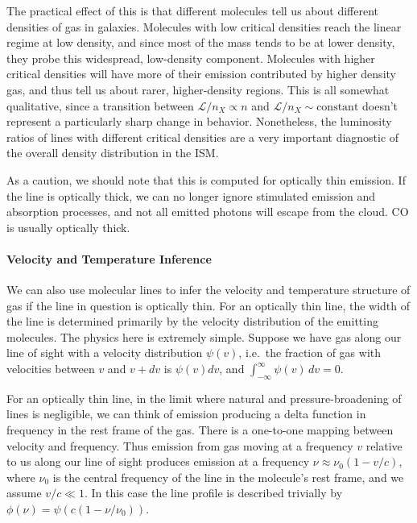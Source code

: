 The practical effect of this is that different molecules tell us about different densities of gas in galaxies. Molecules with low critical densities reach the linear regime at low density, and since most of the mass tends to be at lower density, they probe this widespread, low-density component. Molecules with higher critical densities will have more of their emission contributed by higher density gas, and thus tell us about rarer, higher-density regions. This is all somewhat qualitative, since a transition between $\mathcal{L}/n_X \propto n$ and $\mathcal{L}/n_X \sim\mbox{constant}$ doesn't represent a particularly sharp change in behavior. Nonetheless, the luminosity ratios of lines with different critical densities are a very important diagnostic of the overall density distribution in the ISM.

As a caution, we should note that this is computed for optically thin emission. If the line is optically thick, we can no longer ignore stimulated emission and absorption processes, and not all emitted photons will escape from the cloud. CO is usually optically thick.

\paragraph{Velocity and Temperature Inference}

We can also use molecular lines to infer the velocity and temperature structure of gas if the line in question is optically thin. For an optically thin line, the width of the line is determined primarily by the velocity distribution of the emitting molecules. The physics here is extremely simple. Suppose we have gas along our line of sight with a velocity distribution $\psi(v)$, i.e.\ the fraction of gas with velocities between $v$ and $v+dv$ is $\psi(v) dv$, and $\int_{-\infty}^{\infty} \psi(v) \, dv = 0$.

For an optically thin line, in the limit where natural and pressure-broadening of lines is negligible, we can think of emission producing a delta function in frequency in the rest frame of the gas. There is a one-to-one mapping between velocity and frequency. Thus emission from gas moving at a frequency $v$ relative to us along our line of sight produces emission at a frequency $\nu \approx \nu_0 (1 - v/c)$, where $\nu_0$ is the central frequency of the line in the molecule's rest frame, and we assume $v/c \ll 1$. In this case the line profile is described trivially by $\phi(\nu)=\psi(c(1-\nu/\nu_0))$. 

